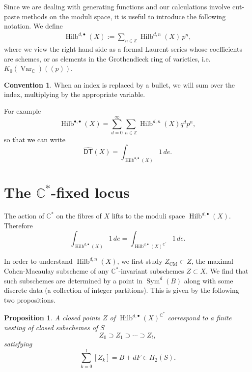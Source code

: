 \documentclass{amsart}
\newtheorem{proposition}[theorem]{Proposition}
\theoremstyle{definition}
\newtheorem{convention}[theorem]{Convention}
\newcommand{\CC} {\mathbb{C}}          %
\newcommand{\ZZ} {\mathbb{Z}}		%
\newcommand{\Sym}{\operatorname{Sym}}
\newcommand{\Hilb}{\operatorname{Hilb}}
\newcommand{\DT}{\mathsf{DT}}
\newcommand{\CM}{\operatorname{CM}}
\newcommand{\Var}{\operatorname{Var}}
\newcommand{\DThat}{\widehat{\DT}}
\begin{document}
Since we are dealing with generating functions and our calculations
involve cut-paste methods on the moduli space, it is useful to
introduce the following notation. We define
\begin{align*}
\Hilb^{d,\bullet}(X) := \sum_{n \in \ZZ} \Hilb^{d,n}(X) \, p^n,
\end{align*}
where we view the right hand side as a formal Laurent series whose
coefficients are schemes, or as elements in the Grothendieck ring of
varieties, i.e. $K_0(\Var_{\CC})(\!(p)\!)$.



\begin{convention}\label{conv: bullet convention}
When an index is replaced by a bullet, we will sum over the index,
multiplying by the appropriate variable. 
\end{convention}

For example
\[
\Hilb^{\bullet ,\bullet}(X) = \sum_{d=0}^{\infty}\sum_{n\in \ZZ}
\Hilb^{d,n}(X) q^{d}p^{n},
\]
so that we can write
\[
\DThat (X) = \int_{\Hilb^{\bullet ,\bullet}(X)} 1\, de .
\]


\section{The $\CC^*$-fixed locus} \label{fixedlocus}

The action of $\CC^*$ on the fibres of $X$ lifts to the moduli space
$\Hilb^{d,\bullet}(X)$. Therefore
$$
\int_{\Hilb^{d,\bullet}(X)} 1 \, de = \int_{\Hilb^{d,\bullet}(X)^{\CC^*}} 1 \, de.
$$

In order to understand $\Hilb^{d,n}(X)$, we first study $Z_{\CM}\subset
Z$, the maximal Cohen-Macaulay subscheme of any $\CC^{*}$-invariant
subschemes $Z\subset X$. We find that such subschemes are determined
by a point in $\Sym^{d}(B)$ along with some discrete data (a
collection of integer partitions). This is given by the following
two propositions.

\begin{proposition} \label{nest}
A closed points $Z$ of $\Hilb^{d,\bullet}(X)^{\CC^*}$ correspond to a finite nesting of closed subschemes of $S$
$$
Z_{0} \supset Z_{1} \supset \cdots \supset Z_{l},
$$
satisfying
$$
\sum_{k=0}^{l} [Z_k] = B + dF \in H_2(S).
$$
\end{proposition}
\end{document}
